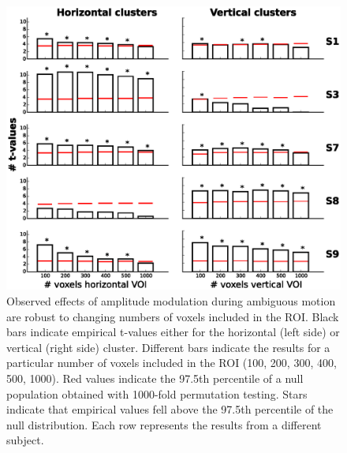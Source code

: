 \begin{figure}[htbp!]
\centering
\includegraphics[width=\textwidth]{figures/chapter_03_SI/figS5.eps}
\caption{Observed effects of amplitude modulation during ambiguous motion are robust to changing numbers of voxels included in the ROI. Black bars indicate empirical t-values either for the horizontal (left side) or vertical (right side) cluster. Different bars indicate the results for a particular number of voxels included in the ROI (100, 200, 300, 400, 500, 1000). Red values indicate the 97.5th percentile of a null population obtained with 1000-fold permutation testing. Stars indicate that empirical values fell above the 97.5th percentile of the null distribution. Each row represents the results from a different subject.}
\label{fig:fig2D_supp}
\end{figure}

